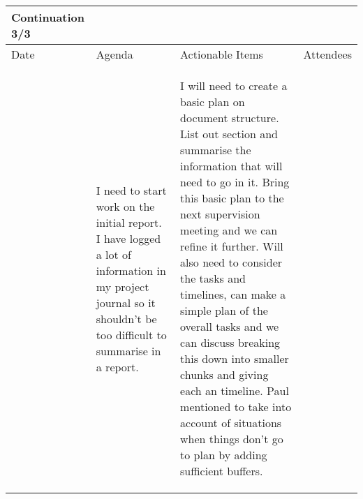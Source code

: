 \begin{table}[!h]
    \centering
    \begin{tabularx}{\textwidth}{|l|X|X|X|}
        \hline
        Continuation 3/3 \\
        \hline
        \hline
        Date & Agenda & Actionable Items & Attendees \\
        \hline
        \hline
        & 
        \begin{myitemize}
            \item I need to start work on the initial report. I have logged a lot of information in my project journal so it shouldn't be too difficult to summarise in a report.
        \end{myitemize} & 
        \begin{myitemize}
            \item I will need to create a basic plan on document structure. List out section and summarise the information that will need to go in it. Bring this basic plan to the next supervision meeting and we can refine it further. Will also need to consider the tasks and timelines, can make a simple plan of the overall tasks and we can discuss breaking this down into smaller chunks and giving each an timeline. Paul mentioned to take into account of situations when things don't go to plan by adding sufficient buffers.
        \end{myitemize} &
        \\
        \hline
    \end{tabularx}
\end{table}
